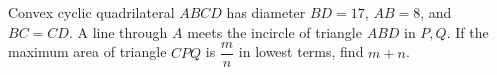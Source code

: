 Convex cyclic quadrilateral $ABCD$ has diameter $BD=17$, $AB=8$, and $BC=CD$. A line through $A$ meets the incircle of triangle $ABD$ in $P,Q$. If the maximum area of triangle $CPQ$ is $\dfrac{m}{n}$ in lowest terms, find $m+n$.
